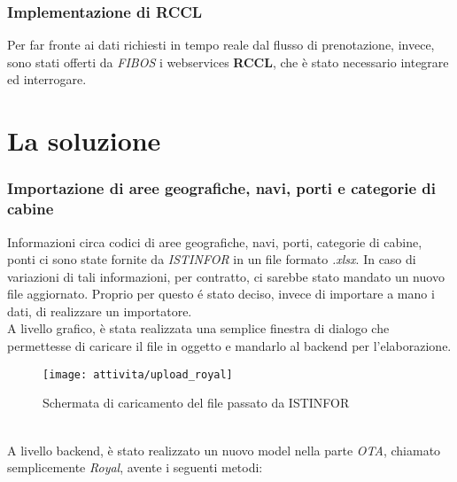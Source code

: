 \subsubsection{Implementazione di RCCL}
Per far fronte ai dati richiesti in tempo reale dal flusso di prenotazione, invece, sono stati offerti da \textit{FIBOS} i \glspl{webservice} \textbf{RCCL}, che è stato necessario integrare ed interrogare.

\section{La soluzione}
\subsubsection{Importazione di aree geografiche, navi, porti e categorie di cabine}
Informazioni circa codici di aree geografiche, navi, porti, categorie di cabine, ponti ci sono state fornite da \textit{ISTINFOR} in un file formato \textit{.xlsx}. In caso di variazioni di tali informazioni, per contratto, ci sarebbe stato mandato un nuovo file aggiornato. Proprio per questo é stato deciso, invece di importare a mano i dati, di realizzare un importatore.\\
A livello grafico, è stata realizzata una semplice finestra di dialogo che permettesse di caricare il file in oggetto e mandarlo al backend per l'elaborazione.
\begin{figure}[!h] 
	\centering 
	\texttt{[image: attivita/upload\_royal]} 
	\caption{Schermata di caricamento del file passato da ISTINFOR}
\end{figure} \\
A livello backend, è stato realizzato un nuovo model nella parte \textit{OTA}, chiamato semplicemente \textit{Royal}, avente i seguenti metodi:

